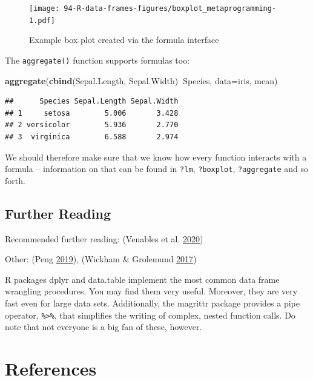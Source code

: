 \documentclass[10pt,b5paper,krantz1]{krantz}
\newenvironment{Shaded}{\begin{snugshade}}{\end{snugshade}}
\newcommand{\DataTypeTok}[1]{\textcolor[rgb]{0.27,0.27,0.27}{#1}}
\newcommand{\KeywordTok}[1]{\textcolor[rgb]{0.27,0.27,0.27}{\textbf{#1}}}
\newcommand{\NormalTok}[1]{#1}
\newcommand{\OperatorTok}[1]{\textcolor[rgb]{0.43,0.43,0.43}{\textbf{#1}}}
\begin{document}
\begin{figure}
\hypertarget{fig:boxplot_metaprogramming}{%
\centering
\texttt{[image: 94-R-data-frames-figures/boxplot\_metaprogramming-1.pdf]}
\caption{Example box plot created via the formula interface}\label{fig:boxplot_metaprogramming}
}
\end{figure}

The \texttt{aggregate()} function supports formulas too:

\begin{Shaded}
\begin{Highlighting}[]
\KeywordTok{aggregate}\NormalTok{(}\KeywordTok{cbind}\NormalTok{(Sepal.Length, Sepal.Width)}\OperatorTok{~}\NormalTok{Species, }\DataTypeTok{data=}\NormalTok{iris, mean)}
\end{Highlighting}
\end{Shaded}

\begin{verbatim}
##      Species Sepal.Length Sepal.Width
## 1     setosa        5.006       3.428
## 2 versicolor        5.936       2.770
## 3  virginica        6.588       2.974
\end{verbatim}

We should therefore make sure that we know how every function interacts
with a formula -- information on that can be found in \texttt{?lm}, \texttt{?boxplot},
\texttt{?aggregate} and so forth.

\hypertarget{further-reading-11}{%
\section{Further Reading}\label{further-reading-11}}

Recommended further reading: (Venables et al. \protect\hyperlink{ref-Rintro}{2020})

Other: (Peng \protect\hyperlink{ref-rprogdatascience}{2019}), (Wickham \& Grolemund \protect\hyperlink{ref-r4ds}{2017})

R packages dplyr and data.table implement the most common
data frame wrangling procedures. You may find them very useful.
Moreover, they are very fast even for large data sets.
Additionally, the magrittr package provides a pipe operator, \texttt{\%\textgreater{}\%},
that simplifies the writing of complex, nested function calls.
Do note that not everyone is a big fan of these, however.

\hypertarget{references}{%
\chapter*{References}\label{references}}
\end{document}

